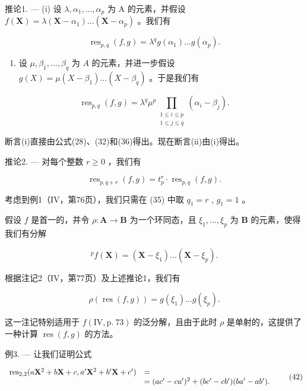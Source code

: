 推论1. --- (i) 设 \(\lambda, \alpha_{1}, \ldots, \alpha_{p}\) 为 A 的元素，并假设 \(f(\mathbf{X}) = \lambda(\mathbf{X} - \alpha_{1}) \ldots (\mathbf{X} - \alpha_{p})\) 。我们有

\[
\operatorname{res} _ {p, q} (f, g) = \lambda^ {q} g (\alpha_ {1}) \dots g (\alpha_ {p}).\tag{39}
\]

\begin{enumerate}
\def\labelenumi{(\roman{enumi})}
\setcounter{enumi}{1}
\tightlist
\item
  设 \(\mu, \beta_1, \ldots, \beta_q\) 为 \(A\) 的元素，并进一步假设 \(g(X) = \mu(X - \beta_1) \ldots (X - \beta_q)\) 。于是我们有
\end{enumerate}

\[
\operatorname{res}_{p,q}(f,g) = \lambda^{q}\mu^{p}\prod_{\substack{1\leqslant i\leqslant p\\ 1\leqslant j\leqslant q}}\left(\alpha_{i} - \beta_{j}\right).\tag{40}
\]

断言(i)直接由公式(28)、(32)和(36)得出。现在断言(ii)由(i)得出。

推论2. --- 对每个整数 \(r \geqslant 0\) ，我们有

\[
\operatorname{res} _ {p, q + r} (f, g) = t _ {p} ^ {r} \cdot \operatorname{res} _ {p, q} (f, g).\tag{41}
\]

考虑到例1（IV，第76页），我们只需在 (35) 中取 \(q_{1} = r\) , \(g_{1} = 1\) 。

假设 \(f\) 是首一的，并令 \(\rho: \mathbf{A} \to \mathbf{B}\) 为一个环同态，且 \(\xi_{1}, \ldots, \xi_{p}\) 为 \(\mathbf{B}\) 的元素，使得我们有分解

\[
{ } ^ { p } f ( \mathbf { X } ) = ( \mathbf { X } - \xi _ { 1 } ) \dots ( \mathbf { X } - \xi _ { p } ) .
\]

根据注记2（IV，第77页）及上述推论1，我们有

\[
\rho (\operatorname{res} (f, g)) = g (\xi_ {1}) \dots g (\xi_ {p}).
\]

这一注记特别适用于 \(f(\mathrm{IV}, \mathrm{p.~73})\) 的泛分解，且由于此时 \(\rho\) 是单射的，这提供了一种计算 \(\operatorname{res}(f, g)\) 的方法。

例3. --- 让我们证明公式

\[
\begin{array}{r l} \operatorname{res} _ {2, 2} (a \mathbf {X} ^ {2} + b \mathbf {X} + c, a ^ {\prime} \mathbf {X} ^ {2} + b ^ {\prime} \mathbf {X} + c ^ {\prime}) & = \\ & = (a c ^ {\prime} - c a ^ {\prime}) ^ {2} + (b c ^ {\prime} - c b ^ {\prime}) (b a ^ {\prime} - a b ^ {\prime}). \end{array}\tag{42}
\]

